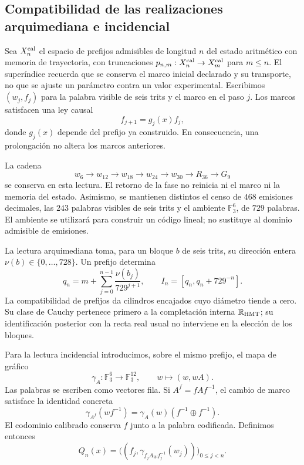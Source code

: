 



\subsection{Compatibilidad de las realizaciones arquimediana e incidencial}
\label{x_reciprocidad:exc:doble-lectura}

Sea $X_n^{\rm cal}$ el espacio de prefijos admisibles de longitud $n$ del
estado aritmético con memoria de trayectoria, con truncaciones
$p_{n,m}:X_n^{\rm cal}\to X_m^{\rm cal}$ para $m\leq n$. El superíndice
recuerda que se conserva el marco inicial declarado y su transporte, no
que se ajuste un parámetro contra un valor experimental. Escribimos
$(w_j,f_j)$ para la palabra visible de seis trits y el marco en el paso
$j$. Los marcos satisfacen una ley causal
\[
 f_{j+1}=g_j(x)f_j,
\]
donde $g_j(x)$ depende del prefijo ya construido. En consecuencia, una
prolongación no altera los marcos anteriores.

La cadena
\[
 w_6\longrightarrow w_{12}\longrightarrow w_{18}
 \longrightarrow w_{24}\longrightarrow w_{30}
 \longrightarrow R_{36}\longrightarrow G_9
\]
se conserva en esta lectura. El retorno de la fase no reinicia ni el
marco ni la memoria del estado. Asimismo, se mantienen distintos el
censo de $468$ emisiones decimales, las $243$ palabras visibles de seis
trits y el ambiente $\mathbb F_3^6$, de $729$ palabras. El ambiente se
utilizará para construir un código lineal; no sustituye al dominio
admisible de emisiones.

La lectura arquimediana toma, para un bloque $b$ de seis trits, su
dirección entera $\nu(b)\in\{0,\ldots,728\}$. Un prefijo determina
\[
 q_n=m+\sum_{j=0}^{n-1}\frac{\nu(b_j)}{729^{j+1}},
 \qquad I_n=[q_n,q_n+729^{-n}].
\]
La compatibilidad de prefijos da cilindros encajados cuyo diámetro tiende
a cero. Su clase de Cauchy pertenece primero a la completación interna
$\mathbb R_{\rm HMT}$; su identificación posterior con la recta real
usual no interviene en la elección de los bloques.

Para la lectura incidencial introducimos, sobre el mismo prefijo, el
mapa de gráfico
\begin{equation}
 \gamma_A:\mathbb F_3^6\longrightarrow\mathbb F_3^{12},
 \qquad w\longmapsto(w,wA).
 \label{x_reciprocidad:exc:gamma}
\end{equation}
Las palabras se escriben como vectores fila. Si $A^f=fAf^{-1}$, el
cambio de marco satisface la identidad concreta
\begin{equation}
 \gamma_{A^f}(wf^{-1})
   =\gamma_A(w)(f^{-1}\oplus f^{-1}).
 \label{x_reciprocidad:exc:covariancia}
\end{equation}
El codominio calibrado conserva $f$ junto a la palabra codificada.
Definimos entonces
\begin{equation}
 Q_n(x)=\bigl((f_j,\gamma_{f_jA_Wf_j^{-1}}(w_j))\bigr)_{0\leq j<n}.
 \label{x_reciprocidad:exc:qn}
\end{equation}

